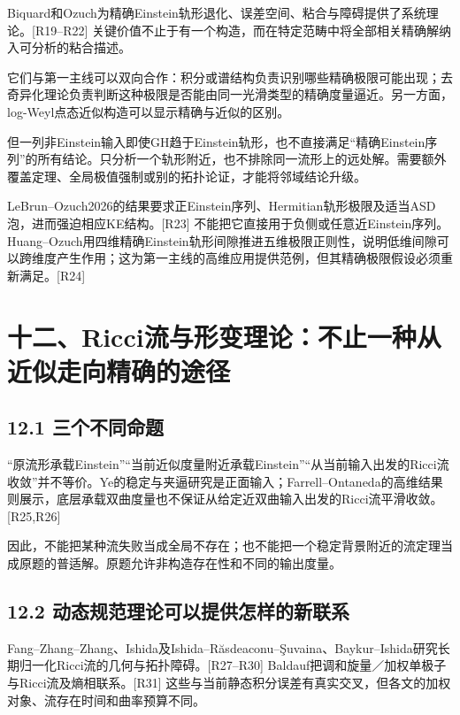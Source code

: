 \documentclass[
  11pt,
  a4paper,
  fontset=none]{ctexart}
\begin{document}
Biquard和Ozuch为精确Einstein轨形退化、误差空间、粘合与障碍提供了系统理论。{[}R19--R22{]}
关键价值不止于有一个构造，而在特定范畴中将全部相关精确解纳入可分析的粘合描述。

它们与第一主线可以双向合作：积分或谱结构负责识别哪些精确极限可能出现；去奇异化理论负责判断这种极限是否能由同一光滑类型的精确度量逼近。另一方面，log-Weyl点态近似构造可以显示精确与近似的区别。

但一列非Einstein输入即使GH趋于Einstein轨形，也不直接满足``精确Einstein序列''的所有结论。只分析一个轨形附近，也不排除同一流形上的远处解。需要额外覆盖定理、全局极值强制或别的拓扑论证，才能将邻域结论升级。

LeBrun--Ozuch2026的结果要求正Einstein序列、Hermitian轨形极限及适当ASD泡，进而强迫相应KE结构。{[}R23{]}
不能把它直接用于负侧或任意近Einstein序列。Huang--Ozuch用四维精确Einstein轨形间隙推进五维极限正则性，说明低维间隙可以跨维度产生作用；这为第一主线的高维应用提供范例，但其精确极限假设必须重新满足。{[}R24{]}

\section{十二、Ricci流与形变理论：不止一种从近似走向精确的途径}\label{ux5341ux4e8cricciux6d41ux4e0eux5f62ux53d8ux7406ux8bbaux4e0dux6b62ux4e00ux79cdux4eceux8fd1ux4f3cux8d70ux5411ux7cbeux786eux7684ux9014ux5f84}

\subsection{12.1
三个不同命题}\label{ux4e09ux4e2aux4e0dux540cux547dux9898}

``原流形承载Einstein''``当前近似度量附近承载Einstein''``从当前输入出发的Ricci流收敛''并不等价。Ye的稳定与夹逼研究是正面输入；Farrell--Ontaneda的高维结果则展示，底层承载双曲度量也不保证从给定近双曲输入出发的Ricci流平滑收敛。{[}R25,R26{]}

因此，不能把某种流失败当成全局不存在；也不能把一个稳定背景附近的流定理当成原题的普适解。原题允许非构造存在性和不同的输出度量。

\subsection{12.2
动态规范理论可以提供怎样的新联系}\label{ux52a8ux6001ux89c4ux8303ux7406ux8bbaux53efux4ee5ux63d0ux4f9bux600eux6837ux7684ux65b0ux8054ux7cfb}

Fang--Zhang--Zhang、Ishida及Ishida--Răsdeaconu--Şuvaina、Baykur--Ishida研究长期归一化Ricci流的几何与拓扑障碍。{[}R27--R30{]}
Baldauf把调和旋量／加权单极子与Ricci流及熵相联系。{[}R31{]}
这些与当前静态积分误差有真实交叉，但各文的加权对象、流存在时间和曲率预算不同。
\end{document}
